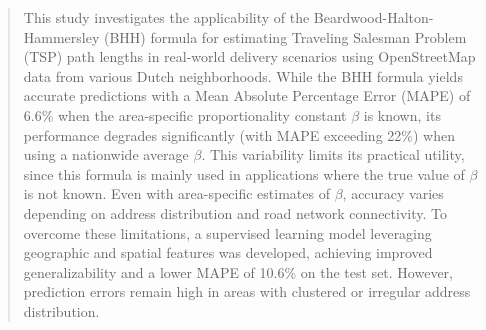 \begin{abstract}
	This study investigates the applicability of the Beardwood-Halton-Hammersley (BHH) formula for estimating Traveling Salesman Problem (TSP) path lengths in real-world delivery scenarios using OpenStreetMap data from various Dutch neighborhoods.
	While the BHH formula yields accurate predictions with a Mean Absolute Percentage Error (MAPE) of 6.6\% when the area-specific proportionality constant $\beta$ is known, its performance degrades significantly (with MAPE exceeding 22\%) when using a nationwide average $\beta$.
	This variability limits its practical utility, since this formula is mainly used in applications where the true value of $\beta$ is not known.
	Even with area-specific estimates of $\beta$, accuracy varies depending on address distribution and road network connectivity.
	To overcome these limitations, a supervised learning model leveraging geographic and spatial features was developed, achieving improved generalizability and a lower MAPE of 10.6\% on the test set.
	However, prediction errors remain high in areas with clustered or irregular address distribution.
\end{abstract}
